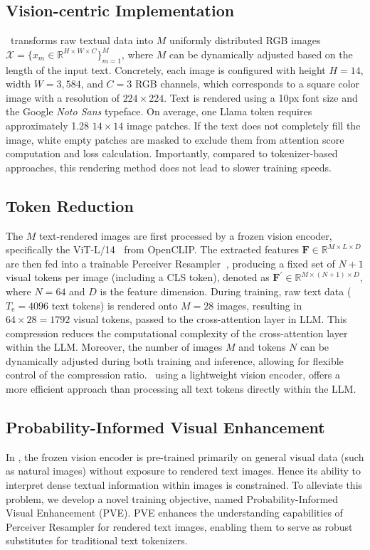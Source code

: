 \subsection{Vision-centric Implementation}
\label{sec::vision-centric}
\ourname\ transforms raw textual data into $M$ uniformly distributed RGB images $\mathcal{X}=\{x_m \in \mathbb{R}^{H\times W \times C}\}_{m=1}^{M}$, where $M$ can be dynamically adjusted based on the length of the input text. Concretely, each image is configured with height $H=14$, width $W=3,584$, and  $C=3$ RGB channels, which corresponds to a square color image with a resolution of $224\times224$. 
Text is rendered using a 10px font size and the Google \textit{Noto Sans} typeface. On average, one Llama token requires approximately 1.28 $14\times14$ image patches. 
If the text does not completely fill the image, white empty patches are masked to exclude them from attention score computation and loss calculation. 
Importantly, compared to tokenizer-based approaches, this rendering method does not lead to slower training speeds.

                                        
\subsection{Token Reduction}
\label{sec::token_reduction}
The $M$ text-rendered images are first processed by a frozen vision encoder, specifically the ViT-L/14$_{\!}$~\cite{radford2021learning} from OpenCLIP. 
The extracted features $\bm{F} \in {\mathbb{R}}^{M \times L \times D}$ are then fed into a trainable Perceiver Resampler$_{\!}$~\cite{alayrac2022flamingo}, producing a fixed set of $N\!+\!1$ visual tokens per image (including a CLS token), denoted as $\bm{F}^{'} \in {\mathbb{R}}^{M \times (N+1) \times D}$, where $N=64$ and $D$ is the feature dimension.
During training, raw text data ($T_\text{e}=4096$ text tokens) is rendered onto $M=28$ images, resulting in $64 \times 28 = 1792$ visual tokens, passed to the cross-attention layer in LLM. 
This compression reduces the computational complexity of the cross-attention layer within the LLM. 
Moreover, the number of images $M$ and tokens $N$ can be dynamically adjusted during both training and inference, allowing for flexible control of the compression ratio. \ourname\ using a lightweight vision encoder, offers a more efficient approach than processing all text tokens directly within the LLM. 
\subsection{Probability-Informed Visual Enhancement}
\label{sec::FCL}
In \ourname, the frozen vision encoder is pre-trained primarily on general visual data (such as natural images) without exposure to rendered text images. Hence its ability to interpret dense textual information within images is constrained. 
To alleviate this problem, we develop a novel training objective, named Probability-Informed Visual Enhancement (PVE). 
PVE enhances the understanding capabilities of Perceiver Resampler for rendered text images, enabling them to serve as robust substitutes for traditional text tokenizers.


